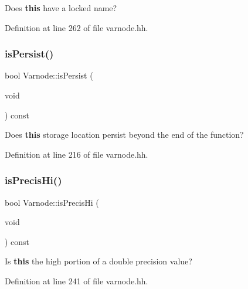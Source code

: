 Does {\bfseries{this}} have a locked name? 



Definition at line 262 of file varnode.\+hh.

\mbox{\label{class_varnode_aec0966bf2652cfd2d53a053f8df9fde1}} 
\subsubsection{\texorpdfstring{isPersist()}{isPersist()}}
{\footnotesize\ttfamily bool Varnode\+::is\+Persist (\begin{DoxyParamCaption}\item[{void}]{ }\end{DoxyParamCaption}) const\hspace{0.3cm}{\ttfamily [inline]}}



Does {\bfseries{this}} storage location persist beyond the end of the function? 



Definition at line 216 of file varnode.\+hh.

\mbox{\label{class_varnode_a606fd6d28785209dc68f35d416bbacab}} 
\subsubsection{\texorpdfstring{isPrecisHi()}{isPrecisHi()}}
{\footnotesize\ttfamily bool Varnode\+::is\+Precis\+Hi (\begin{DoxyParamCaption}\item[{void}]{ }\end{DoxyParamCaption}) const\hspace{0.3cm}{\ttfamily [inline]}}



Is {\bfseries{this}} the high portion of a double precision value? 



Definition at line 241 of file varnode.\+hh.

\mbox{\label{class_varnode_adf76ea55e1c5b314bd8c4bb0917444b9}} 
